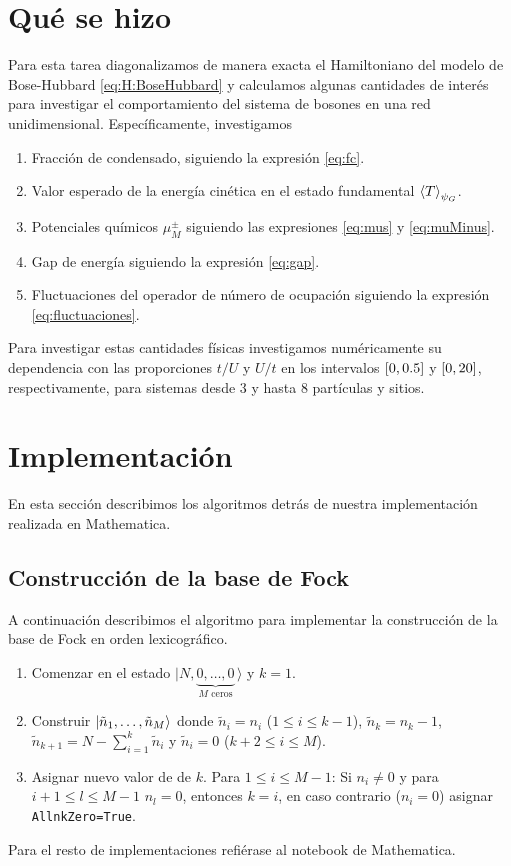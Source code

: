\documentclass[11pt,letterpaper]{article}
\begin{document}
\section{Qué se hizo}\label{sec:queHacer}
Para esta tarea diagonalizamos de manera exacta el Hamiltoniano del 
modelo de Bose-Hubbard \eqref{eq:H:BoseHubbard} y calculamos algunas 
cantidades de interés para investigar el comportamiento del 
sistema de bosones en una red unidimensional. Específicamente, 
investigamos
\begin{enumerate}
\item Fracción de condensado, siguiendo la expresión \eqref{eq:fc}.
\item Valor esperado de la energía cinética en el estado fundamental 
$\expval{T}_{\psi_G}$.
\item Potenciales químicos $\mu_{M}^{\pm}$ siguiendo las expresiones 
\eqref{eq:mus} y \eqref{eq:muMinus}.
\item Gap de energía siguiendo la expresión \eqref{eq:gap}.
\item Fluctuaciones del operador de número de ocupación siguiendo
la expresión \eqref{eq:fluctuaciones}.
\end{enumerate}
Para investigar estas cantidades físicas investigamos numéricamente
su dependencia con las proporciones $t/U$ y $U/t$ en los intervalos 
$\qty[0,0.5]$ y $\qty[0,20]$, respectivamente, para sistemas
desde 3 y hasta 8 partículas y sitios.

\section{Implementación}
En esta sección describimos los algoritmos detrás de nuestra implementación
realizada en Mathematica.
\subsection{Construcción de la base de Fock}
A continuación describimos el algoritmo para implementar la construcción
de la base de Fock en orden lexicográfico. 
\begin{enumerate}
\item Comenzar en el estado $|N,\underbrace{0,\ldots,0}_{M\text{ ceros}}\,\rangle$ y $k=1$.
\item Construir $\ket{\tilde{n}_1,\ldots,\tilde{n}_M}$ donde 
$\tilde{n}_i=n_i$ ($1\leq i\leq k-1$),
$\tilde{n}_k=n_k-1$,
$\tilde{n}_{k+1}=N-\sum_{i=1}^k\tilde{n}_i$ y 
$\tilde{n}_i=0$ ($k+2\leq i\leq M$).
\item Asignar nuevo valor de de $k$. Para $1\leq i\leq M-1$: 
Si $n_i\neq 0$ y para $i+1\leq l\leq M-1$ $n_l=0$, entonces $k=i$,  
en caso contrario ($n_i=0$) asignar \verb|AllnkZero=|\verb|True|.
\end{enumerate}
Para el resto de implementaciones refiérase al notebook de Mathematica.
\end{document}

